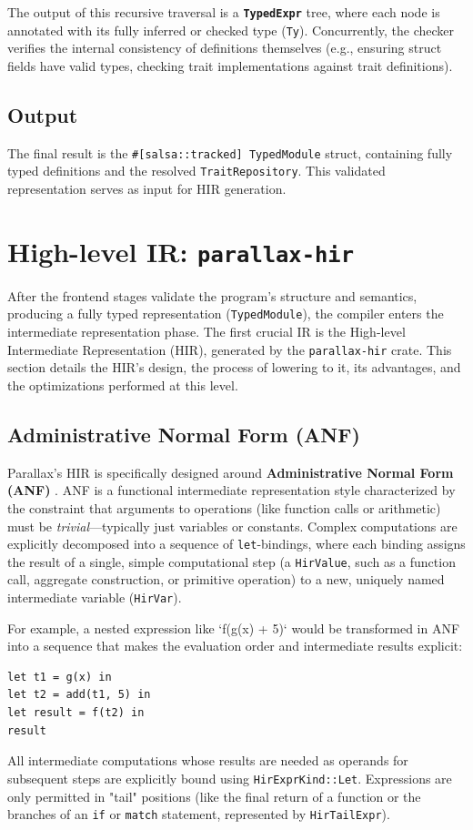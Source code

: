 The output of this recursive traversal is a \textbf{\texttt{TypedExpr}} tree, where each node is annotated with its fully inferred or checked type (\texttt{Ty}). Concurrently, the checker verifies the internal consistency of definitions themselves (e.g., ensuring struct fields have valid types, checking trait implementations against trait definitions).

\subsection{Output}

The final result is the \texttt{\#[salsa::tracked] TypedModule} struct, containing fully typed definitions and the resolved \texttt{TraitRepository}. This validated representation serves as input for HIR generation.

\section{High-level IR: \texttt{parallax-hir}}

After the frontend stages validate the program's structure and semantics, producing a fully typed representation (\texttt{TypedModule}), the compiler enters the intermediate representation phase. The first crucial IR is the High-level Intermediate Representation (HIR), generated by the \texttt{parallax-hir} crate. This section details the HIR's design, the process of lowering to it, its advantages, and the optimizations performed at this level.

\subsection{Administrative Normal Form (ANF)}

Parallax's HIR is specifically designed around \textbf{Administrative Normal Form (ANF)} \cite{Flanagan1993}. ANF is a functional intermediate representation style characterized by the constraint that arguments to operations (like function calls or arithmetic) must be \textit{trivial}---typically just variables or constants. Complex computations are explicitly decomposed into a sequence of \texttt{let}-bindings, where each binding assigns the result of a single, simple computational step (a \texttt{HirValue}, such as a function call, aggregate construction, or primitive operation) to a new, uniquely named intermediate variable (\texttt{HirVar}).

For example, a nested expression like `f(g(x) + 5)` would be transformed in ANF into a sequence that makes the evaluation order and intermediate results explicit:
\begin{verbatim}
let t1 = g(x) in
let t2 = add(t1, 5) in
let result = f(t2) in
result
\end{verbatim}
All intermediate computations whose results are needed as operands for subsequent steps are explicitly bound using \texttt{HirExprKind::Let}. Expressions are only permitted in "tail" positions (like the final return of a function or the branches of an \texttt{if} or \texttt{match} statement, represented by \texttt{HirTailExpr}).

